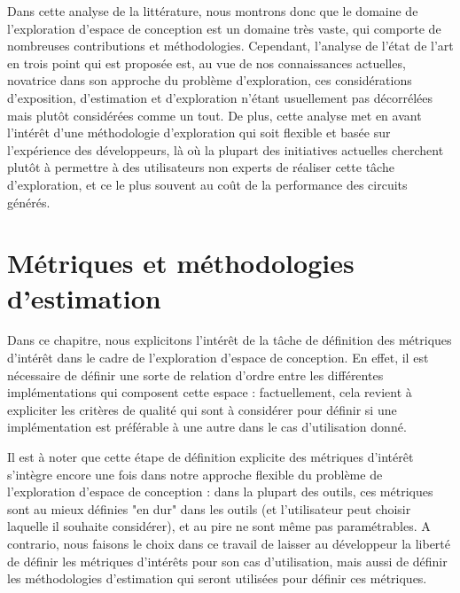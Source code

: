     \clearpage

    Dans cette analyse de la littérature, nous montrons donc que le domaine de l'exploration d'espace de conception est un domaine très vaste, qui comporte de nombreuses contributions et méthodologies.
    Cependant, l'analyse de l'état de l'art en trois point qui est proposée est, au vue de nos connaissances actuelles, novatrice dans son approche du problème d'exploration, ces considérations d'exposition, d'estimation et d'exploration n'étant usuellement pas décorrélées mais plutôt considérées comme un tout.
    De plus, cette analyse met en avant l'intérêt d'une méthodologie d'exploration qui soit flexible et basée sur l'expérience des développeurs, là où la plupart des initiatives actuelles cherchent plutôt à permettre à des utilisateurs non experts de réaliser cette tâche d'exploration, et ce le plus souvent au coût de la performance des circuits générés.

\section{Métriques et méthodologies d'estimation}
\label{ch.resume:sec.estimation}
    Dans ce chapitre, nous explicitons l'intérêt de la tâche de définition des métriques d'intérêt dans le cadre de l'exploration d'espace de conception.
    En effet, il est nécessaire de définir une sorte de relation d'ordre entre les différentes implémentations qui composent cette espace : factuellement, cela revient à expliciter les critères de qualité qui sont à considérer pour définir si une implémentation est préférable à une autre dans le cas d'utilisation donné.

    Il est à noter que cette étape de définition explicite des métriques d'intérêt s'intègre encore une fois dans notre approche flexible du problème de l'exploration d'espace de conception : dans la plupart des outils, ces métriques sont au mieux définies "en dur" dans les outils (et l'utilisateur peut choisir laquelle il souhaite considérer), et au pire ne sont même pas paramétrables.
    A contrario, nous faisons le choix dans ce travail de laisser au développeur la liberté de définir les métriques d'intérêts pour son cas d'utilisation, mais aussi de définir les méthodologies d'estimation qui seront utilisées pour définir ces métriques.

